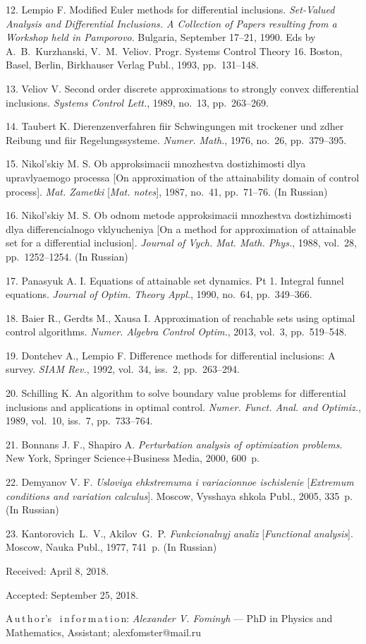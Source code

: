 {12. {Lempio F.} Modified Euler methods for differential
inclusions. {\it Set-Valued Analysis and Differential Inclusions.
A Collection of Papers resulting from a Workshop held in
Pamporovo}. Bulgaria, September 17--21, 1990. Eds by
A.~B.~Kurzhanski, V.~M.~Veliov.  Progr. Systems Control Theory 16.
Boston, Basel, Berlin, Birkhauser Verlag Publ., 1993,
pp.~131--148.

13. {Veliov V.} Second order discrete approximations to strongly
convex differential inclusions. {\it Systems Control Lett.}, 1989,
no.~13, pp.~263--269.

14. {Taubert K.} Dierenzenverfahren fiir Schwingungen mit
trockener und zdher Reibung und fiir Regelungssysteme. {\it Numer.
Math.}, 1976, no.~26, pp.~379--395.

15. {Nikol'skiy M. S.} Ob approksimacii mnozhestva dostizhimosti
dlya upravlyaemogo processa [On approximation of the attainability
domain of control process]. {\it Mat. Zametki} [{\it Mat. notes}],
1987, no.~41, pp.~71--76. (In Russian)

16. {Nikol'skiy M. S.} Ob odnom metode approksimacii mnozhestva
dostizhimosti dlya differencialnogo vklyucheniya [On a method for
approximation of attainable set for a differential inclusion].
{\it Journal of Vych. Mat. Math. Phys.}, 1988, vol.~28,
pp.~1252--1254. (In Russian)

17. {Panasyuk A. I.} Equations of attainable set dynamics. Pt 1.
Integral funnel equations. {\it Journal of Optim. Theory Appl.},
1990, no.~64, pp.~349--366.

18. {Baier R., Gerdts M., Xausa I.} Approximation of reachable
sets using optimal control algorithms. {\it Numer. Algebra Control
Optim.}, 2013, vol.~3, pp.~519--548.

19. {Dontchev A., Lempio F.} Difference methods for differential
inclusions: A survey. {\it SIAM Rev.}, 1992, vol.~34, iss.~2,
pp.~263--294.

20. {Schilling K.} An algorithm to solve boundary value problems
for differential inclusions and applications in optimal control.
{\it Numer. Funct. Anal. and Optimiz.}, 1989, vol.~10, iss.~7,
pp.~733--764.

21. {Bonnans J. F., Shapiro A.} {\it Perturbation analysis of
optimization problems}. New York, Springer Science+Business Media,
2000, 600~p.

22. {Demyanov V. F.} {\it Usloviya ehkstremuma i variacionnoe
ischislenie} [{\it Extremum conditions and variation calculus}].
Moscow, Vysshaya shkola Publ., 2005, 335~p. (In Russian)

23. {Kantorovich~L.~V., Akilov~G.~P.} {\it Funkcionalnyj analiz}
[{\it Functional analysis}]. Moscow, Nauka Publ., 1977, 741~p. (In
Russian)

\vskip 1.5mm

%


Received:  April 8, 2018.

Accepted: September 25, 2018.

\vskip6mm A\,u\,t\,h\,o\,r's \ i\,n\,f\,o\,r\,m\,a\,t\,i\,o\,n:
\vskip2mm\textit{Alexander V. Fominyh} --- PhD in Physics and
Mathematics, Assistant; alexfomster@mail.ru

}

